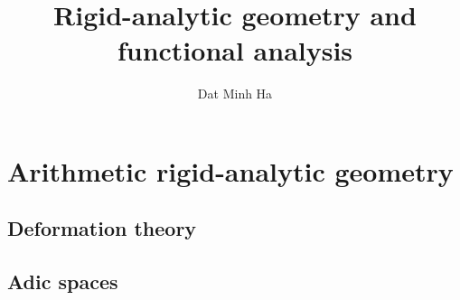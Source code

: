 

\setcounter{chapter}{-1}




    \title{Rigid-analytic geometry and functional analysis}
    
    \author{Dat Minh Ha}
    \maketitle
    
    \begin{abstract}
        
    \end{abstract}
    
    {
      \hypersetup{} 
      \dominitoc
      \tableofcontents %
    }
    
    

    \part{Arithmetic rigid-analytic geometry}
        \chapter{Deformation theory}
            \begin{abstract}
                
            \end{abstract}
            
            \minitoc
        
            
            
            
            
            
        
        \chapter{Adic spaces}
            \begin{abstract}
                
            \end{abstract}
            
            \minitoc
            
            
            
